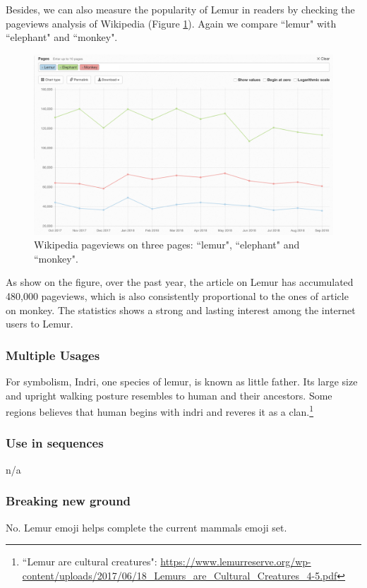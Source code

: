 \documentclass{article}
\begin{document}
Besides, we can also measure the popularity of Lemur in readers by checking the pageviews analysis of Wikipedia (Figure \ref{fig:wikipedia-pageviews}). Again we compare ``lemur" with ``elephant" and ``monkey".

\begin{figure}[h]
  \includegraphics[width=\linewidth]{img/wikipedia-pageviews.png}
  \caption{Wikipedia pageviews on three pages: ``lemur", ``elephant" and ``monkey".}
  \label{fig:wikipedia-pageviews}
\end{figure}

As show on the figure, over the past year, the article on Lemur has accumulated 480,000 pageviews, which is also consistently proportional to the ones of article on monkey. The statistics shows a strong and lasting interest among the internet users to Lemur.

\subsubsection{Multiple Usages}
For symbolism, Indri, one species of lemur, is known as little father. Its large size and upright walking posture resembles to human and their ancestors. Some regions believes that human begins with indri and reveres it as a clan.\footnote{``Lemur are cultural creatures": \url{https://www.lemurreserve.org/wp-content/uploads/2017/06/18\_Lemurs\_are\_Cultural\_Creatures\_4-5.pdf}}

\subsubsection{Use in sequences}
n/a

\subsubsection{Breaking new ground}
No. Lemur emoji helps complete the current mammals emoji set.
\end{document}
